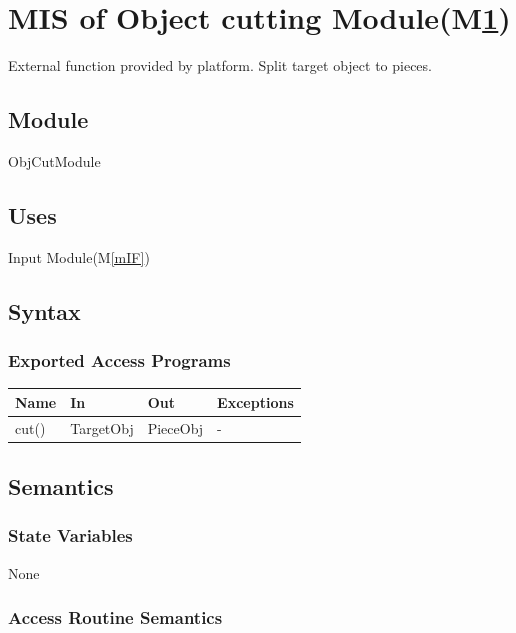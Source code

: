 \documentclass[12pt, titlepage]{article}
\newcommand{\mref}[1]{M\ref{#1}}
\begin{document}
\section{MIS of Object cutting Module(\mref{mOC})} \label{mOC}

External function provided by platform. Split target object to pieces.

\subsection{Module}

ObjCutModule

\subsection{Uses}

Input Module(\mref{mIF})

\subsection{Syntax}

\subsubsection{Exported Access Programs}

\begin{center}
	\begin{tabular}{p{2cm} p{4cm} p{4cm} p{2cm}}
		\hline
		\textbf{Name} & \textbf{In} & \textbf{Out} & \textbf{Exceptions} \\
		\hline
		cut() & TargetObj & PieceObj & - \\
		\hline
	\end{tabular}
\end{center}

\subsection{Semantics}

\subsubsection{State Variables}

None

\subsubsection{Access Routine Semantics}
\end{document}
